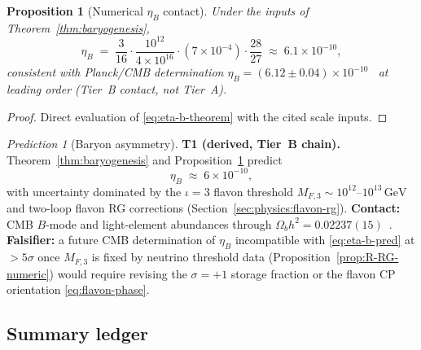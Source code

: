 \documentclass[aps,prd,onecolumn,amsmath,amssymb,nofootinbib,11pt]{revtex4-2}
\numberwithin{equation}{section}
\theoremstyle{plain}
\newtheorem{proposition}[theorem]{Proposition}
\theoremstyle{definition}
\theoremstyle{remark}
\newtheorem{prediction}[theorem]{Prediction}
\begin{document}
\begin{proposition}[Numerical $\eta_B$ contact]\label{prop:eta-b}
Under the inputs of Theorem~\ref{thm:baryogenesis},
\begin{equation}\label{eq:eta-b-numeric}
  \eta_B
  \;=\;
  \frac{3}{16}\cdot\frac{10^{12}}{4\times 10^{16}}
  \cdot (7\times 10^{-4})\cdot\frac{28}{27}
  \;\approx\;
  6.1\times 10^{-10},
\end{equation}
consistent with Planck/CMB determination
$\eta_B = (6.12\pm 0.04)\times 10^{-10}$~\cite{PDG2025} at leading order
(Tier~B contact, not Tier~A).
\end{proposition}

\begin{proof}
Direct evaluation of \eqref{eq:eta-b-theorem} with the cited scale inputs.
\end{proof}

\begin{prediction}[Baryon asymmetry]\label{pred:eta-b}
\textbf{T1 (derived, Tier~B chain).}
Theorem~\ref{thm:baryogenesis} and Proposition~\ref{prop:eta-b} predict
\begin{equation}\label{eq:eta-b-pred}
  \eta_B \;\approx\; 6\times 10^{-10},
\end{equation}
with uncertainty dominated by the $\iota=3$ flavon threshold
$M_{F,3}\sim 10^{12}$--$10^{13}\,\mathrm{GeV}$ and two-loop flavon RG
corrections (Section~\ref{sec:physics:flavon-rg}). \textbf{Contact:}
CMB $B$-mode and light-element abundances through
$\Omega_b h^2 = 0.02237(15)$~\cite{PDG2025}.
\textbf{Falsifier:} a future CMB determination of $\eta_B$ incompatible with
\eqref{eq:eta-b-pred} at $>5\sigma$ once $M_{F,3}$ is fixed by neutrino
threshold data (Proposition~\ref{prop:R-RG-numeric}) would require revising
the $\sigma=+1$ storage fraction or the flavon CP orientation
\eqref{eq:flavon-phase}.
\end{prediction}

\subsection{Summary ledger}
\label{sec:baryogenesis:table}
\end{document}
